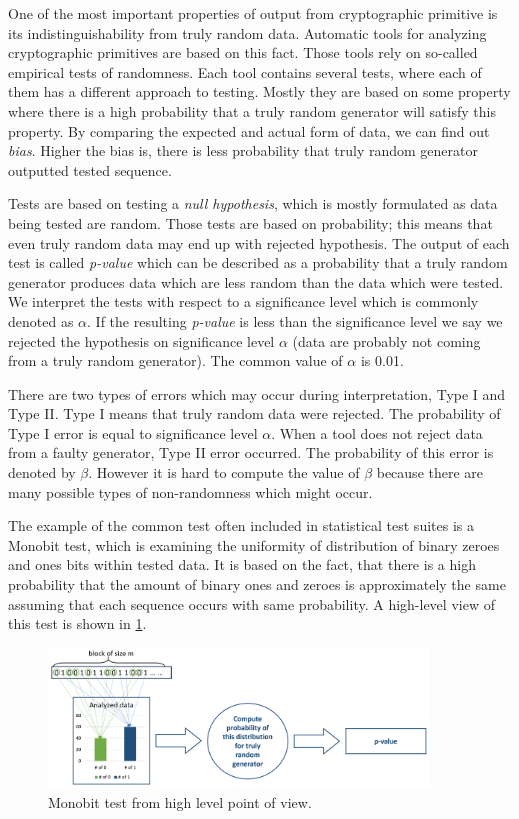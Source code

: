 \documentclass[
    digital,    %
    oneside,    %
    color,
    11pt,
    nocover,
    notable,
    nolof,
    nolot,
    final
]{fithesis3}
\renewcommand\_{\textunderscore\allowbreak}
\begin{document}
One of the most important properties of output from cryptographic primitive is its indistinguishability from truly random data. Automatic tools for analyzing cryptographic primitives are based on this fact. Those tools rely on so-called empirical tests of randomness. Each tool contains several tests, where each of them has a different approach to testing. Mostly they are based on some property where there is a high probability that a truly random generator will satisfy this property. By comparing the expected and actual form of data, we can find out \textit{bias}. Higher the bias is, there is less probability that truly random generator outputted tested sequence.

Tests are based on testing a \textit{null hypothesis}, which is mostly formulated as data being tested are random. Those tests are based on probability; this means that even truly random data may end up with rejected hypothesis. The output of each test is called \textit{p-value} which can be described as a probability that a truly random generator produces data which are less random than the data which were tested. We interpret the tests with respect to a significance level which is commonly denoted as $\alpha$. If the resulting \textit{p-value} is less than the significance level we say we rejected the hypothesis on significance level $\alpha$ (data are probably not coming from a truly random generator). The common value of $\alpha$ is 0.01. \cite{nist-explanation}

There are two types of errors which may occur during interpretation, Type I and Type II. Type I means that truly random data were rejected. The probability of Type I error is equal to significance level $\alpha$. When a tool does not reject data from a faulty generator, Type II error occurred. The probability of this error is denoted by $\beta$. However it is hard to compute the value of $\beta$ because there are many possible types of non-randomness which might occur. \cite{nist-explanation}

The example of the common test often included in statistical test suites is a Monobit test, which is examining the uniformity of distribution of binary zeroes and ones bits within tested data. It is based on the fact, that there is a high probability that the amount of binary ones and zeroes is approximately the same assuming that each sequence occurs with same probability. A high-level view of this test is shown in \cref{fig:monobit}. 

\begin{figure}[h]
	\centering
	\includegraphics[width=0.9\textwidth]{./images/pictures/monobit-high-level.png}
	\caption{Monobit test from high level point of view.}
	\label{fig:monobit}
\end{figure}
\end{document}
